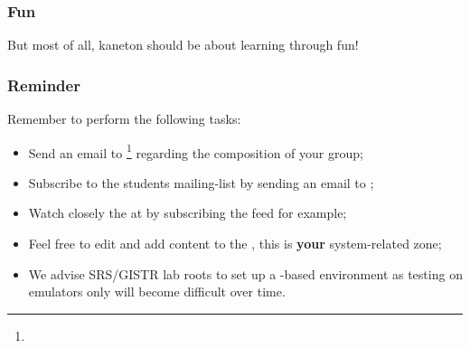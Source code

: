 
\begin{frame}
  \frametitle{Fun}

  But most of all, kaneton should be about learning through fun!
\end{frame}


\begin{frame}
  \frametitle{Reminder}

  Remember to perform the following tasks:

  \begin{itemize}
    \item
      Send an email to
      \footnote{}
      regarding the composition of your group;
    \item
      Subscribe to the students mailing-list
       by sending an email to
      ;
    \item
      Watch closely the  at  by
      subscribing the  feed for example;
    \item
      Feel free to edit and add content to the , this is
      \textbf{your} system-related zone;
    \item
      We advise SRS/GISTR lab roots to set up a -based environment
      as testing on emulators only will become difficult over time.
  \end{itemize}
\end{frame}



